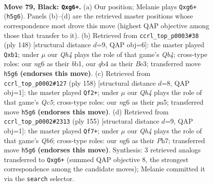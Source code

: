 \documentclass[11pt]{article}
\begin{document}
\clearpage

\begin{figure}[p]\centering
\begin{subfigure}{0.46\textwidth}\centering
\resizebox{\linewidth}{!}{%
\newchessgame
\chessboard[
  setfen={6K1/8/6N1/7q/1Q6/8/8/k7 b - - 28 79},
  showmover=false,
  pgfstyle=straightmove, color=movearrow, markmove={h5-g6}
]}
\caption{}
\end{subfigure}\hfill
\begin{subfigure}{0.46\textwidth}\centering
\resizebox{\linewidth}{!}{%
\newchessgame
\chessboard[
  setfen={8/6K1/k7/8/1Q6/4B3/8/1b6 w - - 5 75},
  showmover=false,
  pgfstyle=straightmove, color=movearrow, markmove={b4-b1}
]}
\caption{}
\end{subfigure}
\\[4pt]
\begin{subfigure}{0.46\textwidth}\centering
\resizebox{\linewidth}{!}{%
\newchessgame
\chessboard[
  setfen={6q1/3K4/7P/p1Q5/8/8/1k6/8 w - - 8 80},
  showmover=false,
  pgfstyle=straightmove, color=movearrow, markmove={c5-f2}
]}
\caption{}
\end{subfigure}\hfill
\begin{subfigure}{0.46\textwidth}\centering
\resizebox{\linewidth}{!}{%
\newchessgame
\chessboard[
  setfen={Q7/7p/7P/8/5K2/1q6/8/5k2 b - - 8 78},
  showmover=false,
  pgfstyle=straightmove, color=movearrow, markmove={b3-f7}
]}
\caption{}
\end{subfigure}
\caption{\textbf{Move 79, Black: \texttt{Qxg6+}.} (a) Our position; Melanie plays \texttt{Qxg6+} (\texttt{h5g6}). Panels (b)--(d) are the retrieved master positions whose correspondence most drove this move (highest QAP objective among those that transfer to it). (b) Retrieved from \texttt{ccrl\_top\_p0003\#38} (ply 148) [structural distance $d$=9, QAP obj=6]: the master played \texttt{Qxb1}; under $\mu$ our \emph{Qh4} plays the role of that game's \emph{Qb4}; cross-type roles: our \emph{n}g6 as their \emph{b}b1, our \emph{q}b4 as their \emph{B}e3; transferred move \texttt{h5g6} \textbf{(endorses this move)}. (c) Retrieved from \texttt{ccrl\_top\_p0002\#127} (ply 158) [structural distance $d$=8, QAP obj=1]: the master played \texttt{Qf2+}; under $\mu$ our \emph{Qh4} plays the role of that game's \emph{Qc5}; cross-type roles: our \emph{n}g6 as their \emph{p}a5; transferred move \texttt{h5g6} \textbf{(endorses this move)}. (d) Retrieved from \texttt{ccrl\_top\_p0002\#2313} (ply 155) [structural distance $d$=9, QAP obj=1]: the master played \texttt{Qf7+}; under $\mu$ our \emph{Qh4} plays the role of that game's \emph{Qb6}; cross-type roles: our \emph{n}g6 as their \emph{P}h7; transferred move \texttt{h5g6} \textbf{(endorses this move)}. Synthesis: 3 retrieved analogs transferred to \texttt{Qxg6+} (summed QAP objective 8, the strongest correspondence among the candidate moves); Melanie committed it via the \texttt{search} selector.}
\label{fig:thought-m157}
\end{figure}
\end{document}
